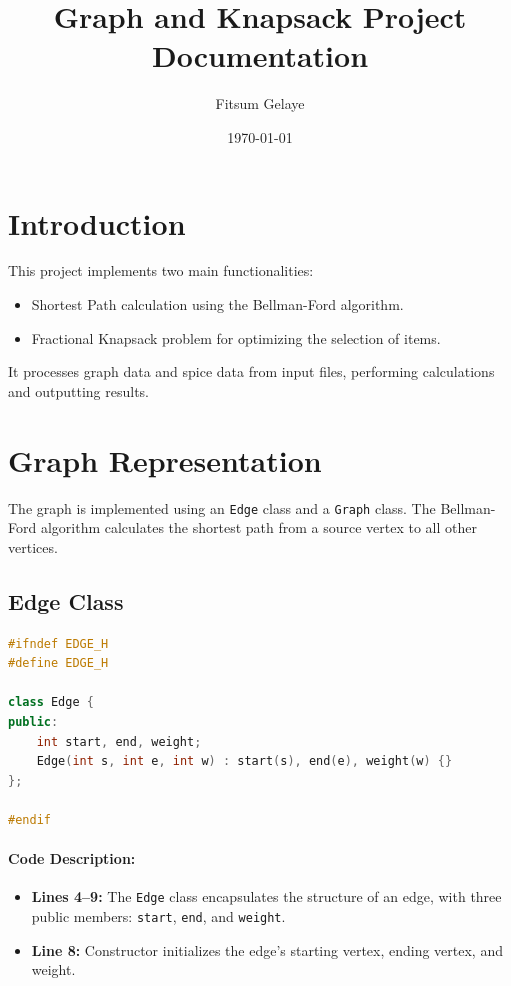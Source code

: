 \documentclass[a4paper,12pt]{article}
\title{\color{myblue}Graph and Knapsack Project Documentation}
\author{\color{mygreen}Fitsum Gelaye}
\date{\today}
\begin{document}
\maketitle

\tableofcontents
\newpage

\section{Introduction}
This project implements two main functionalities:
\begin{itemize}
    \item Shortest Path calculation using the Bellman-Ford algorithm.
    \item Fractional Knapsack problem for optimizing the selection of items.
\end{itemize}
It processes graph data and spice data from input files, performing calculations and outputting results. 

\section{Graph Representation}
The graph is implemented using an \texttt{Edge} class and a \texttt{Graph} class. The Bellman-Ford algorithm calculates the shortest path from a source vertex to all other vertices.

\subsection{Edge Class}
\begin{lstlisting}[language=C++, caption=Edge Class Definition]
#ifndef EDGE_H
#define EDGE_H

class Edge {
public:
    int start, end, weight;
    Edge(int s, int e, int w) : start(s), end(e), weight(w) {}
};

#endif 
\end{lstlisting}

\paragraph{Code Description:}
\begin{itemize}
    \item \textbf{Lines 4--9:} The \texttt{Edge} class encapsulates the structure of an edge, with three public members: \texttt{start}, \texttt{end}, and \texttt{weight}.
    \item \textbf{Line 8:} Constructor initializes the edge's starting vertex, ending vertex, and weight.
\end{itemize}
\end{document}
